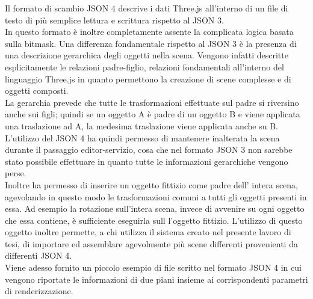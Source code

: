 Il formato di scambio JSON 4 descrive i dati Three.js all’interno di un file di testo di più semplice lettura e scrittura rispetto al JSON 3.
\\
In questo formato è inoltre completamente assente la complicata logica basata sulla bitmask.
Una differenza fondamentale rispetto al JSON 3 è la presenza di una descrizione gerarchica degli oggetti nella scena. Vengono infatti descritte esplicitamente le relazioni padre-figlio, relazioni fondamentali all’interno del linguaggio Three.js in quanto permettono la creazione di scene complesse e di oggetti composti.
\\
La gerarchia prevede che tutte le trasformazioni effettuate sul padre si riversino anche sui figli; quindi se un oggetto A è padre di un oggetto B e viene applicata una traslazione ad A, la medesima traslazione viene applicata anche su B. 
\\
L’utilizzo del JSON 4 ha quindi permesso di mantenere inalterata la scena durante il passaggio editor-servizio, cosa che nel formato JSON 3 non sarebbe stato possibile effettuare in quanto tutte le informazioni gerarchiche vengono perse. 
\\
Inoltre ha permesso di inserire un oggetto fittizio come padre dell’ intera scena, agevolando in questo modo le trasformazioni comuni a tutti gli oggetti presenti in essa. 
Ad esempio la rotazione sull’intera scena, invece di avvenire su ogni oggetto che essa contiene, è sufficiente eseguirla sull l’oggetto fittizio.
L’utilizzo di questo oggetto inoltre permette, a chi utilizza il sistema creato nel presente lavoro di tesi, di importare ed assemblare agevolmente più scene differenti provenienti da differenti JSON 4. 
\\
Viene adesso fornito un piccolo esempio di file scritto nel formato JSON 4 in cui vengono riportate le informazioni di due piani insieme ai corrispondenti parametri di renderizzazione.




